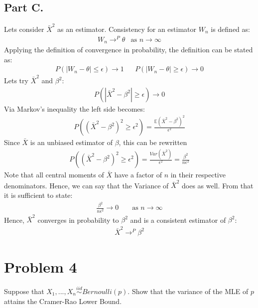 \documentclass{article}
\begin{document}
\subsection*{Part C.}
Lets consider $\bar{X}^2$ as an estimator. Consistency for an estimator $W_n$ is defined as:
\begin{align*}
W_n \rightarrow^P \theta & \text{as } n \rightarrow \infty
\end{align*}
Applying the definition of convergence in probability, the definition can be stated as:
\begin{align*}
P(|W_n-\theta| \leq \epsilon) \rightarrow 1 && P(|W_n-\theta| \geq \epsilon) \rightarrow 0
\end{align*}
Lets try $\bar{X}^2$ and $\beta^2$:
\begin{align*}
P(|\bar{X}^2-\beta^2| \geq \epsilon) \rightarrow 0
\end{align*}
Via Markov's inequality the left side becomes:
\begin{align*}
P((\bar{X}^2-\beta^2)^2 \geq \epsilon^2) = \frac{\mathbb{E}(\bar{X}^2-\beta^2)^2}{\epsilon^2}
\end{align*}
Since $\bar{X}$ is an unbiased estimator of $\beta$, this can be rewritten
\begin{align*}
P((\bar{X}^2-\beta^2)^2 \geq \epsilon^2) = \frac{Var(\bar{X}^2)}{\epsilon^2} = \frac{\beta^2}{n \epsilon^2}
\end{align*}
Note that all central moments of $\bar{X}$ have a factor of $n$ in their respective denominators. Hence, we can say that the Variance of $\bar{X}^2$ does as well. From that it is sufficient to state:
\begin{align*}
\frac{\beta^2}{n \epsilon^2} \rightarrow 0 && \text{ as } n \rightarrow \infty
\end{align*}
Hence, $\bar{X}^2$ converges in probability to $\beta^2$ and is a consistent estimator of $\beta^2$:
\begin{align*}
\boxed{ \bar{X}^2 \rightarrow^P \beta^2 }
\end{align*}
\clearpage

\section*{Problem 4}
Suppose that $X_1,...,X_n \overset{iid}{\sim} Bernoulli(p)$. Show that the variance of the MLE of $p$ attains the Cramer-Rao Lower Bound.
\end{document}
